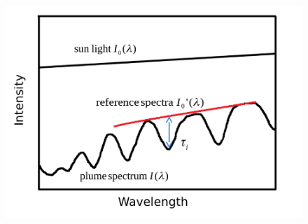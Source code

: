 \documentclass[aspectratio=169]{beamer} %
\begin{document}
\begin{frame}
\begin{multicols}{2}
	\begin{figure}
		\centering
		\includegraphics[width=0.95\linewidth]{../../Bilder/dddd}
		\label{fig:dddd}
	\end{figure}	
	\end{multicols}
	\end{frame}
\end{document}
